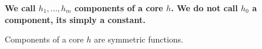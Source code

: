 \textbf{ We call $h_1,...,h_m$ components of a core $h$. We do not call $h_0$ a component, its simply a constant.}
 
 
 
 
\begin{lemma}\cite[Section 5.1.5]{serfling80}
\label{lem:symetric}
Components of a core $h$ are symmetric functions.
\end{lemma}






